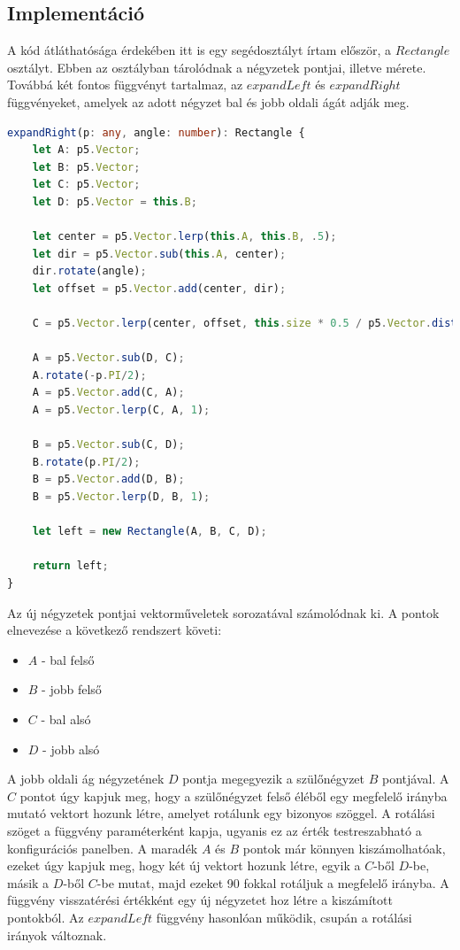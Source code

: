 \subsection*{Implementáció}
A kód átláthatósága érdekében itt is egy segédosztályt írtam először, a $Rectangle$ osztályt. Ebben az osztályban tárolódnak a négyzetek pontjai, illetve mérete. Továbbá két fontos függvényt tartalmaz, az $expandLeft$ és $expandRight$ függvényeket, amelyek az adott négyzet bal és jobb oldali ágát adják meg. 
\begin{lstlisting}[language=typescript]
expandRight(p: any, angle: number): Rectangle {
	let A: p5.Vector;
	let B: p5.Vector;
	let C: p5.Vector;
	let D: p5.Vector = this.B;
	
	let center = p5.Vector.lerp(this.A, this.B, .5);
	let dir = p5.Vector.sub(this.A, center);
	dir.rotate(angle);
	let offset = p5.Vector.add(center, dir);
	
	C = p5.Vector.lerp(center, offset, this.size * 0.5 / p5.Vector.dist(offset, center));
	
	A = p5.Vector.sub(D, C);
	A.rotate(-p.PI/2);
	A = p5.Vector.add(C, A);
	A = p5.Vector.lerp(C, A, 1);
	
	B = p5.Vector.sub(C, D);
	B.rotate(p.PI/2);
	B = p5.Vector.add(D, B);
	B = p5.Vector.lerp(D, B, 1);
	
	let left = new Rectangle(A, B, C, D);
	
	return left;
}
\end{lstlisting}
Az új négyzetek pontjai vektorműveletek sorozatával számolódnak ki. A pontok elnevezése a következő rendszert követi: 
\begin{itemize}
	\item $A$ - bal felső
	\item $B$ - jobb felső
	\item $C$ - bal alsó
	\item $D$ - jobb alsó
\end{itemize}
A jobb oldali ág négyzetének $D$ pontja megegyezik a szülőnégyzet $B$ pontjával. A $C$ pontot úgy kapjuk meg, hogy a szülőnégyzet felső éléből egy megfelelő irányba mutató vektort hozunk létre, amelyet rotálunk egy bizonyos szöggel. A rotálási szöget a függvény paraméterként kapja, ugyanis ez az érték testreszabható a konfigurációs panelben. A maradék $A$ és $B$ pontok már könnyen kiszámolhatóak, ezeket úgy kapjuk meg, hogy két új vektort hozunk létre, egyik a $C$-ből $D$-be, másik a $D$-ből $C$-be mutat, majd ezeket 90 fokkal rotáljuk a megfelelő irányba. A függvény visszatérési értékként egy új négyzetet hoz létre a kiszámított pontokból. Az $expandLeft$ függvény hasonlóan működik, csupán a rotálási irányok változnak. 
